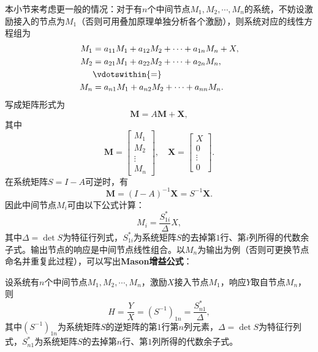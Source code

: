 本小节来考虑更一般的情况：对于有$n$个中间节点$M_1,M_2,\cdots,M_n$的系统，不妨设激励接入的节点为$M_1$（否则可用叠加原理单独分析各个激励），则系统对应的线性方程组为
\begin{equation}
    \begin{aligned}
        M_1&=a_{11} M_1 + a_{12} M_2 + \cdots + a_{1n} M_n + X,\\
        M_2&=a_{21} M_1 + a_{22} M_2 + \cdots + a_{2n} M_n,\\
        &\vdotswithin{=}\\
        M_n&=a_{n1} M_1 + a_{n2} M_2 + \cdots + a_{nn} M_n.
    \end{aligned}
\end{equation}
写成矩阵形式为
\begin{equation}
    \mathbf{M}=A\mathbf{M}+\mathbf{X},
\end{equation}
其中
\begin{equation}
    \mathbf{M}=\begin{bmatrix}
        M_1 \\
        M_2 \\
        \vdots \\
        M_n
    \end{bmatrix},\quad\mathbf{X}=\begin{bmatrix}
        X \\
        0 \\
        \vdots \\
        0
    \end{bmatrix}.
\end{equation}
在系统矩阵$S=I-A$可逆时，有
\begin{equation}
    \mathbf{M}=(I-A)^{-1}\mathbf{X}=S^{-1}\mathbf{X}.
\end{equation}
因此中间节点$M_i$可由以下公式计算：
\begin{equation}
    M_i=\frac{S^*_{1i}}{\Delta}X,
\end{equation}
其中$\Delta=\det S$为特征行列式，$S^*_{1i}$为系统矩阵$S$的去掉第$1$行、第$i$列所得的代数余子式。输出节点的响应是中间节点线性组合。以$M_n$为输出为例（否则可更换节点命名并重复此过程），可以写出\textbf{Mason增益公式}：
\begin{theorem}[Mason增益公式]
    设系统有$n$个中间节点$M_1,M_2,\cdots,M_n$，激励$X$接入节点$M_1$，响应$Y$取自节点$M_n$，则
    \begin{equation}
        H=\frac{Y}{X}=(S^{-1})_{1n}=\frac{S^*_{n1}}{\Delta},
    \end{equation}
    其中$(S^{-1})_{1n}$为系统矩阵$S$的逆矩阵的第$1$行第$n$列元素，$\Delta=\det S$为特征行列式，$S^*_{n1}$为系统矩阵$S$的去掉第$n$行、第$1$列所得的代数余子式。
\end{theorem}

